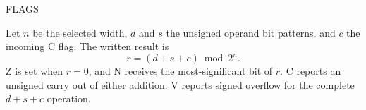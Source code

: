 \begin{manualflageffects}{FLAGS}
\end{manualflageffects}

Let \(n\) be the selected width, \(d\) and \(s\) the unsigned operand bit patterns, and \(c\) the incoming C flag. The written result is
\[
  r = (d + s + c) \bmod 2^n .
\]
Z is set when \(r=0\), and N receives the most-significant bit of \(r\). C reports an unsigned carry out of either addition. V reports signed overflow for the complete \(d+s+c\) operation.
